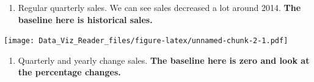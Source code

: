 \documentclass[]{book}
\newenvironment{Shaded}{\begin{snugshade}}{\end{snugshade}}
\newcommand{\KeywordTok}[1]{\textcolor[rgb]{0.13,0.29,0.53}{\textbf{#1}}}
\newcommand{\DataTypeTok}[1]{\textcolor[rgb]{0.13,0.29,0.53}{#1}}
\newcommand{\DecValTok}[1]{\textcolor[rgb]{0.00,0.00,0.81}{#1}}
\newcommand{\FloatTok}[1]{\textcolor[rgb]{0.00,0.00,0.81}{#1}}
\newcommand{\StringTok}[1]{\textcolor[rgb]{0.31,0.60,0.02}{#1}}
\newcommand{\CommentTok}[1]{\textcolor[rgb]{0.56,0.35,0.01}{\textit{#1}}}
\newcommand{\OperatorTok}[1]{\textcolor[rgb]{0.81,0.36,0.00}{\textbf{#1}}}
\newcommand{\NormalTok}[1]{#1}
\providecommand{\tightlist}{%
  \setlength{\itemsep}{0pt}\setlength{\parskip}{0pt}}
\theoremstyle{definition}
\theoremstyle{definition}
\theoremstyle{definition}
\theoremstyle{remark}
\begin{document}
\begin{enumerate}
\def\labelenumi{\arabic{enumi}.}
\tightlist
\item
  Regular quarterly sales. We can see sales decreased a lot around 2014.
  \textbf{The baseline here is historical sales.}
\end{enumerate}

\begin{Shaded}
\end{Shaded}

\texttt{[image: Data\_Viz\_Reader\_files/figure-latex/unnamed-chunk-2-1.pdf]}

\begin{enumerate}
\def\labelenumi{\arabic{enumi}.}
\setcounter{enumi}{1}
\tightlist
\item
  Quarterly and yearly change sales. \textbf{The baseline here is zero
  and look at the percentage changes.}
\end{enumerate}
\end{document}
